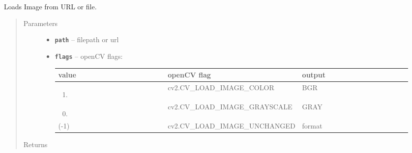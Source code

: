 \documentclass[letterpaper,10pt,english]{sphinxmanual}
\begin{document}
\begin{fulllineitems}
\label{RRtoolbox.lib:RRtoolbox.lib.image.loadsfrom}
Loads Image from URL or file.
\begin{quote}\begin{description}
\item[{Parameters}] \leavevmode\begin{itemize}
\item {} 
\textbf{\texttt{path}} -- filepath or url

\item {} 
\textbf{\texttt{flags}} -- 
openCV flags:

\begin{tabular}{|p{0.317\linewidth}|p{0.317\linewidth}|p{0.317\linewidth}|}
\hline
\textsf{\relax 
value
} & \textsf{\relax 
openCV flag
} & \textsf{\relax 
output
}\\
\hline\begin{enumerate}
\item {} 
\end{enumerate}
 & 
cv2.CV\_LOAD\_IMAGE\_COLOR
 & 
BGR
\\
\hline\begin{enumerate}
\setcounter{enumi}{-1}
\item {} 
\end{enumerate}
 & 
cv2.CV\_LOAD\_IMAGE\_GRAYSCALE
 & 
GRAY
\\
\hline
(-1)
 & 
cv2.CV\_LOAD\_IMAGE\_UNCHANGED
 & 
format
\\
\hline\end{tabular}



\end{itemize}

\item[{Returns}] \leavevmode


\end{description}\end{quote}

\end{fulllineitems}

\end{document}
